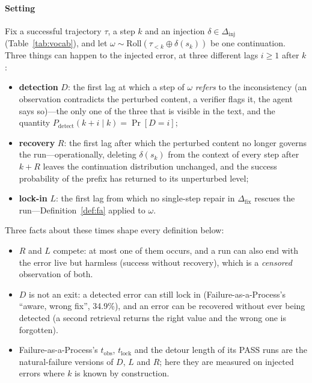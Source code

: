 \paragraph{Setting} Fix a successful trajectory $\tau$, a step $k$ and an injection $\delta\in\Delta_{\mathrm{inj}}$ (Table~\ref{tab:vocab}), and let $\omega\sim\mathrm{Roll}(\tau_{<k}\oplus\delta(s_k))$ be one continuation. Three things can happen to the injected error, at three different lags $i\ge1$ after $k$:
\begin{itemize}[leftmargin=1.1em]
\item \textbf{detection} $D$: the first lag at which a step of $\omega$ \emph{refers} to the inconsistency (an observation contradicts the perturbed content, a verifier flags it, the agent says so)---the only one of the three that is visible in the text, and the quantity $P_{\mathrm{detect}}(k{+}i\mid k)=\Pr[D{=}i]$;
\item \textbf{recovery} $R$: the first lag after which the perturbed content no longer governs the run---operationally, deleting $\delta(s_k)$ from the context of every step after $k{+}R$ leaves the continuation distribution unchanged, and the success probability of the prefix has returned to its unperturbed level;
\item \textbf{lock-in} $L$: the first lag from which no single-step repair in $\Delta_{\mathrm{fix}}$ rescues the run---Definition~\ref{def:fa} applied to $\omega$.
\end{itemize}
Three facts about these times shape every definition below:
\begin{itemize}[leftmargin=1.1em]
\item $R$ and $L$ compete: at most one of them occurs, and a run can also end with the error live but harmless (success without recovery), which is a \emph{censored} observation of both.
\item $D$ is not an exit: a detected error can still lock in (Failure-as-a-Process's ``aware, wrong fix'', 34.9\%), and an error can be recovered without ever being detected (a second retrieval returns the right value and the wrong one is forgotten).
\item Failure-as-a-Process's $t_{\mathrm{obs}}$, $t_{\mathrm{lock}}$ and the detour length of its PASS runs are the natural-failure versions of $D$, $L$ and $R$; here they are measured on injected errors where $k$ is known by construction.
\end{itemize}

